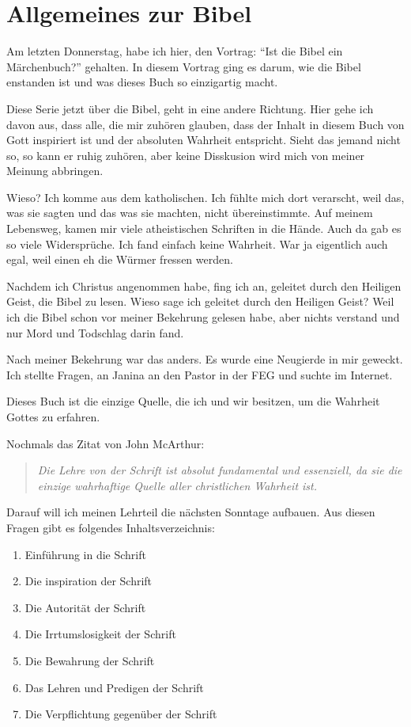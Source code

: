 \section{Allgemeines zur Bibel}

Am letzten Donnerstag, habe ich hier, den Vortrag: \enquote{Ist die Bibel ein Märchenbuch?} gehalten. In diesem Vortrag ging es darum, wie die Bibel enstanden ist und was dieses Buch so einzigartig macht.

Diese Serie jetzt über die Bibel, geht in eine andere Richtung. Hier gehe ich davon aus, dass alle, die mir zuhören glauben, dass der Inhalt in diesem Buch von Gott inspiriert ist und der absoluten Wahrheit entspricht. Sieht das jemand nicht so, so kann er ruhig zuhören, aber keine Disskusion wird mich von meiner Meinung abbringen.

Wieso? Ich komme aus dem katholischen. Ich fühlte mich dort verarscht, weil das, was sie sagten und das was sie machten, nicht übereinstimmte. Auf meinem Lebensweg, kamen mir viele atheistischen Schriften in die Hände. Auch da gab es so viele Widersprüche. Ich fand einfach keine Wahrheit. War ja eigentlich auch egal, weil einen eh die Würmer fressen werden.

Nachdem ich Christus angenommen habe, fing ich an, geleitet durch den Heiligen Geist, die Bibel zu lesen. Wieso sage ich geleitet durch den Heiligen Geist? Weil ich die Bibel schon vor meiner Bekehrung gelesen habe, aber nichts verstand und nur Mord und Todschlag darin fand.

Nach meiner Bekehrung war das anders. Es wurde eine Neugierde in mir geweckt. Ich stellte Fragen, an Janina an den Pastor in der FEG und suchte im Internet.

Dieses Buch ist die einzige Quelle, die ich und wir besitzen, um die Wahrheit Gottes zu erfahren. 

Nochmals das Zitat von John McArthur:
\begin{quote}
    \textit{Die Lehre von der Schrift ist absolut fundamental und essenziell, da sie die einzige wahrhaftige Quelle aller christlichen Wahrheit ist.}
\end{quote}
Darauf will ich meinen Lehrteil die nächsten Sonntage aufbauen.
Aus diesen Fragen gibt es folgendes Inhaltsverzeichnis:
\begin{enumerate}
    \item Einführung in die Schrift
    \item Die inspiration der Schrift
    \item Die Autorität der Schrift
    \item Die Irrtumslosigkeit der Schrift
    \item Die Bewahrung der Schrift
    \item Das Lehren und Predigen der Schrift
    \item Die Verpflichtung gegenüber der Schrift
\end{enumerate}



